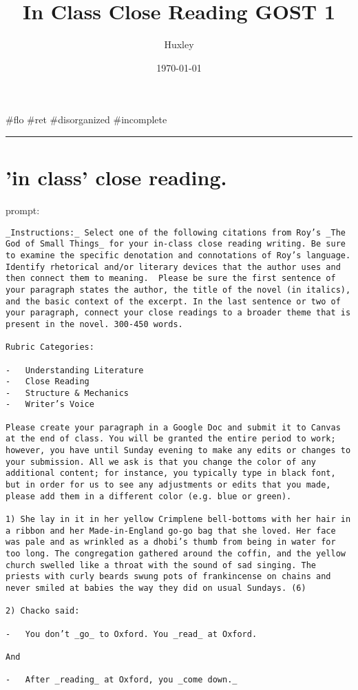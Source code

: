 \documentclass[letterpaper]{article}
\author{Huxley}
\date{\today}
\title{In Class Close Reading GOST 1}
\renewcommand{\tableofcontents}{}
\begin{document}
\tableofcontents

\#flo \#ret \#disorganized \#incomplete

\noindent\rule{\textwidth}{0.5pt}

\section{'in class' close reading.}
\label{sec:org55868cf}
prompt:

\begin{verbatim}
_Instructions:_ Select one of the following citations from Roy’s _The God of Small Things_ for your in-class close reading writing. Be sure to examine the specific denotation and connotations of Roy’s language. Identify rhetorical and/or literary devices that the author uses and then connect them to meaning.  Please be sure the first sentence of your paragraph states the author, the title of the novel (in italics), and the basic context of the excerpt. In the last sentence or two of your paragraph, connect your close readings to a broader theme that is present in the novel. 300-450 words.

Rubric Categories:

-   Understanding Literature
-   Close Reading
-   Structure & Mechanics
-   Writer’s Voice

Please create your paragraph in a Google Doc and submit it to Canvas at the end of class. You will be granted the entire period to work; however, you have until Sunday evening to make any edits or changes to your submission. All we ask is that you change the color of any additional content; for instance, you typically type in black font, but in order for us to see any adjustments or edits that you made, please add them in a different color (e.g. blue or green).

1) She lay in it in her yellow Crimplene bell-bottoms with her hair in a ribbon and her Made-in-England go-go bag that she loved. Her face was pale and as wrinkled as a dhobi’s thumb from being in water for too long. The congregation gathered around the coffin, and the yellow church swelled like a throat with the sound of sad singing. The priests with curly beards swung pots of frankincense on chains and never smiled at babies the way they did on usual Sundays. (6)

2) Chacko said:

-   You don’t _go_ to Oxford. You _read_ at Oxford.

And

-   After _reading_ at Oxford, you _come down._


\end{verbatim}
\end{document}
